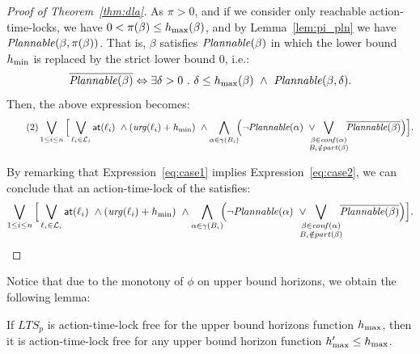 \begin{proof}[Proof of Theorem~\ref{thm:dla}]
As $\pi > 0$, and if we consider only reachable action-time-locks, we have $0 < \pi(\beta) \leq
h_{\max}(\beta)$, and by Lemma~\ref{lem:pi_pln} we have $\mathit{Plannable(\beta,\pi(\beta))}$.
That is, $\beta$ satisfies  $\mathit{Plannable(\beta)}$ in which the lower bound $h_{\min}$ is replaced by the
strict lower bound 0, i.e.:
\begin{displaymath}
\overline{\plntxt{\beta}} \Leftrightarrow \exists \delta > 0\ . \ \delta \leq \hmax(\beta) \ 
  \wedge \ \plnIntxt{\beta}{\delta}.
\end{displaymath}
Then, the above expression becomes:
\begin{equation}
  \label{eq:case2}\tag{2}
  \bigvee_{1\le i\le n}\Big[\bigvee_{\loc_i \in \Loc_i}\al{\loc_i}\ \wedge(\urg(\loc_i)+\hmin) \
  \wedge\bigwedge_{\alpha \in \gamma(B_i)}\hspace*{-1ex}\Big(  \neg\plntxt{\alpha} \
  \vee\hspace*{-2ex}\bigvee_{\substack{\beta\in\confl(\alpha)\\B_i\notin\p{\beta}}}\hspace*{-1ex}
  \overline{\plntxt{\beta}} \Big)\Big].
\end{equation}

By remarking that Expression~\ref{eq:case1} implies Expression~\ref{eq:case2}, 
we can conclude that an action-time-lock of the \lps satisfies:
\begin{displaymath}
  \bigvee_{1\le i\le n}\Big[\bigvee_{\loc_i \in \Loc_i}\al{\loc_i}\ \wedge(\urg(\loc_i)+\hmin) \ 
  \wedge\bigwedge_{\alpha \in \gamma(B_i)}\hspace*{-1ex}\Big(  \neg\plntxt{\alpha} \
  \vee\hspace*{-2ex}\bigvee_{\substack{\beta\in\confl(\alpha)\\B_i\notin\p{\beta}}}\hspace*{-1ex}
  \overline{\plntxt{\beta}} \Big)\Big].
\end{displaymath}
\end{proof}

Notice that due to the monotony of $\phi$ on upper bound horizons, we obtain the following lemma:

\begin{lemma}\label{lemma:mon}
  If $LTS_p$ is action-time-lock free for the upper bound horizons function $h_{\max}$, 
  then it is action-time-lock free for any upper bound horizon function $h_{\max}'\le h_{\max}$.
\end{lemma}

